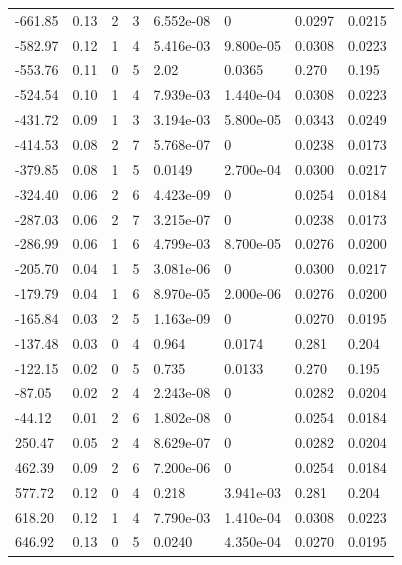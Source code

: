 \documentclass[preview]{standalone}
\begin{document}
{{\begin{tabular}{L{1.2cm}C{1.2cm} C{0.3cm}C{0.5cm} C{1.4cm}C{1.4cm} C{1.4cm}C{1.4cm}}
  -661.85  &  0.13  & 2     &  3 &  6.552e-08  & 0  & 0.0297 &  0.0215   \\ 
  -582.97  &  0.12  & 1     &  4 &  5.416e-03  & 9.800e-05  & 0.0308 &  0.0223   \\ 
  -553.76  &  0.11  & 0     &  5 &  2.02  & 0.0365  & 0.270 &  0.195   \\ 
  -524.54  &  0.10  & 1     &  4 &  7.939e-03  & 1.440e-04  & 0.0308 &  0.0223   \\ 
  -431.72  &  0.09  & 1     &  3 &  3.194e-03  & 5.800e-05  & 0.0343 &  0.0249   \\ 
  -414.53  &  0.08  & 2     &  7 &  5.768e-07  & 0  & 0.0238 &  0.0173   \\ 
  -379.85  &  0.08  & 1     &  5 &  0.0149  & 2.700e-04  & 0.0300 &  0.0217   \\ 
  -324.40  &  0.06  & 2     &  6 &  4.423e-09  & 0  & 0.0254 &  0.0184   \\ 
  -287.03  &  0.06  & 2     &  7 &  3.215e-07  & 0  & 0.0238 &  0.0173   \\ 
  -286.99  &  0.06  & 1     &  6 &  4.799e-03  & 8.700e-05  & 0.0276 &  0.0200   \\ 
  -205.70  &  0.04  & 1     &  5 &  3.081e-06  & 0  & 0.0300 &  0.0217   \\ 
  -179.79  &  0.04  & 1     &  6 &  8.970e-05  & 2.000e-06  & 0.0276 &  0.0200   \\ 
  -165.84  &  0.03  & 2     &  5 &  1.163e-09  & 0  & 0.0270 &  0.0195   \\ 
  -137.48  &  0.03  & 0     &  4 &  0.964  & 0.0174  & 0.281 &  0.204   \\ 
  -122.15  &  0.02  & 0     &  5 &  0.735  & 0.0133  & 0.270 &  0.195   \\ 
  -87.05  &  0.02  & 2     &  4 &  2.243e-08  & 0  & 0.0282 &  0.0204   \\ 
  -44.12  &  0.01  & 2     &  6 &  1.802e-08  & 0  & 0.0254 &  0.0184   \\ 
  250.47  &  0.05  & 2     &  4 &  8.629e-07  & 0  & 0.0282 &  0.0204   \\ 
  462.39  &  0.09  & 2     &  6 &  7.200e-06  & 0  & 0.0254 &  0.0184   \\ 
  577.72  &  0.12  & 0     &  4 &  0.218  & 3.941e-03  & 0.281 &  0.204   \\ 
  618.20  &  0.12  & 1     &  4 &  7.790e-03  & 1.410e-04  & 0.0308 &  0.0223   \\ 
  646.92  &  0.13  & 0     &  5 &  0.0240  & 4.350e-04  & 0.0270 &  0.0195   \\ 

\end{tabular}}}
\end{document}
